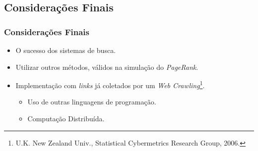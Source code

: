 \documentclass{beamer}
\begin{document}
\begin{frame}
	\section{Considerações Finais}
	\frametitle{Considerações Finais}

\begin{itemize}
	\item O sucesso dos sistemas de busca.
	
	\vspace{0.5cm}	

	\item Utilizar outros m\'etodos, válidos na simulação do \textit{PageRank}.
		
	\vspace{0.5cm}

	\item Implementação com \textit{links} já coletados por um \textit{Web Crawling}\footnote{\tiny \justifying U.K. New Zealand Univ., Statistical Cybermetrics Research Group, 2006.}.
	
	\begin{itemize}
		\item Uso de outras linguagens de programação.
		\item Computação Distribuída.
	\end{itemize}
\end{itemize}		
	
\end{frame}
\end{document}

